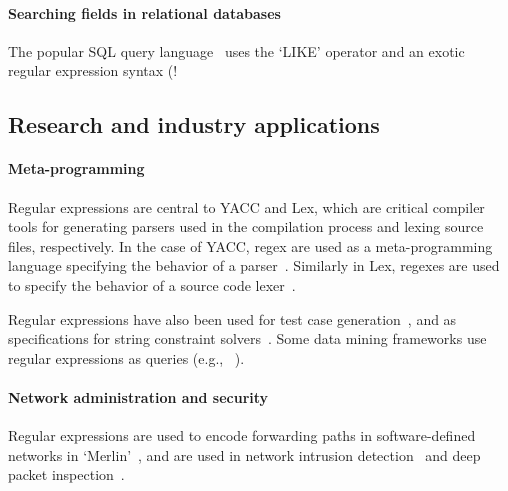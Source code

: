 \paragraph{Searching fields in relational databases}  The popular SQL query language~ uses the `LIKE' operator and an exotic regular expression syntax (\bverb!%


\subsection{Research and industry applications}
\paragraph{Meta-programming}  Regular expressions are central to YACC and Lex, which are critical compiler tools for generating parsers used in the compilation process and lexing source files, respectively.  In the case of YACC, regex are used as a meta-programming language specifying the behavior of a parser~.  Similarly in Lex, regexes are used to specify the behavior of a source code lexer~.

Regular expressions have also been used for test case generation~,  and as specifications for string constraint solvers~.  Some data mining frameworks use regular expressions as queries (e.g., ~).

\paragraph{Network administration and security} Regular expressions are used to encode forwarding paths in software-defined networks in `Merlin'~, and are used in network intrusion detection~ and deep packet inspection~.

